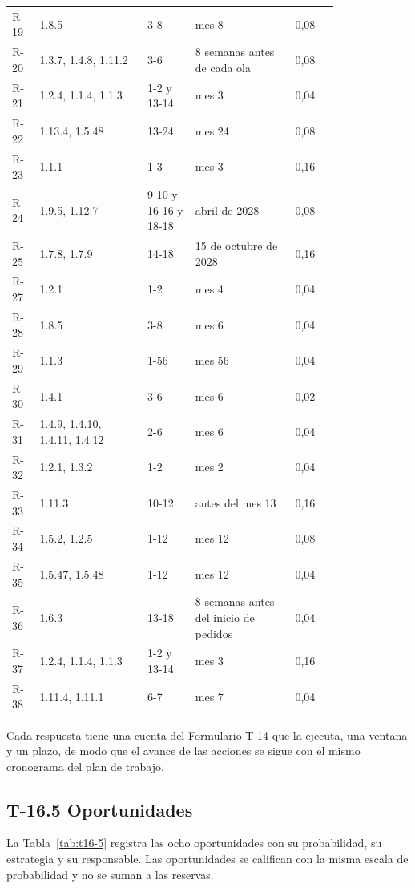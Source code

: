 \documentclass[11pt]{article}
\begin{document}
\begin{longtable}{p{0.060\linewidth}p{0.270\linewidth}p{0.120\linewidth}p{0.250\linewidth}p{0.110\linewidth}}
R-19 & 1.8.5 & 3-8 & mes 8 & 0,08 \\
R-20 & 1.3.7, 1.4.8, 1.11.2 & 3-6 & 8 semanas antes de cada ola & 0,08 \\
R-21 & 1.2.4, 1.1.4, 1.1.3 & 1-2 y 13-14 & mes 3 & 0,04 \\
R-22 & 1.13.4, 1.5.48 & 13-24 & mes 24 & 0,08 \\
R-23 & 1.1.1 & 1-3 & mes 3 & 0,16 \\
R-24 & 1.9.5, 1.12.7 & 9-10 y 16-16 y 18-18 & abril de 2028 & 0,08 \\
R-25 & 1.7.8, 1.7.9 & 14-18 & 15 de octubre de 2028 & 0,16 \\
R-27 & 1.2.1 & 1-2 & mes 4 & 0,04 \\
R-28 & 1.8.5 & 3-8 & mes 6 & 0,04 \\
R-29 & 1.1.3 & 1-56 & mes 56 & 0,04 \\
R-30 & 1.4.1 & 3-6 & mes 6 & 0,02 \\
R-31 & 1.4.9, 1.4.10, 1.4.11, 1.4.12 & 2-6 & mes 6 & 0,04 \\
R-32 & 1.2.1, 1.3.2 & 1-2 & mes 2 & 0,04 \\
R-33 & 1.11.3 & 10-12 & antes del mes 13 & 0,16 \\
R-34 & 1.5.2, 1.2.5 & 1-12 & mes 12 & 0,08 \\
R-35 & 1.5.47, 1.5.48 & 1-12 & mes 12 & 0,04 \\
R-36 & 1.6.3 & 13-18 & 8 semanas antes del inicio de pedidos & 0,04 \\
R-37 & 1.2.4, 1.1.4, 1.1.3 & 1-2 y 13-14 & mes 3 & 0,16 \\
R-38 & 1.11.4, 1.11.1 & 6-7 & mes 7 & 0,04 \\
\end{longtable}

Cada respuesta tiene una cuenta del Formulario T-14 que la ejecuta, una ventana y un plazo, de modo que el avance de las acciones se sigue con el mismo cronograma del plan de trabajo.

\subsection{T-16.5 Oportunidades}

La Tabla~\mbox{\ref{tab:t16-5}} registra las ocho oportunidades con su probabilidad, su estrategia y su responsable. Las oportunidades se califican con la misma escala de probabilidad y no se suman a las reservas.
\end{document}
